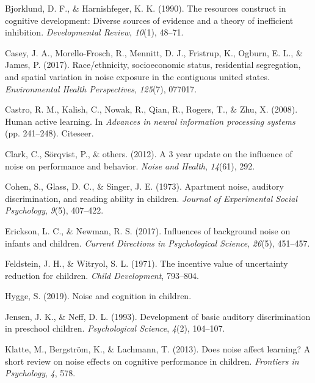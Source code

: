 \documentclass[10pt, letterpaper]{article}
\newenvironment{CSLReferences}%
  {}%
  {\par}
\begin{document}
\hypertarget{refs}{}
\begin{CSLReferences}{1}{0}
\leavevmode\hypertarget{ref-bjorklund1990}{}%
Bjorklund, D. F., \& Harnishfeger, K. K. (1990). The resources construct
in cognitive development: Diverse sources of evidence and a theory of
inefficient inhibition. \emph{Developmental Review}, \emph{10}(1),
48--71.

\leavevmode\hypertarget{ref-casey2017}{}%
Casey, J. A., Morello-Frosch, R., Mennitt, D. J., Fristrup, K., Ogburn,
E. L., \& James, P. (2017). Race/ethnicity, socioeconomic status,
residential segregation, and spatial variation in noise exposure in the
contiguous united states. \emph{Environmental Health Perspectives},
\emph{125}(7), 077017.

\leavevmode\hypertarget{ref-castro2008}{}%
Castro, R. M., Kalish, C., Nowak, R., Qian, R., Rogers, T., \& Zhu, X.
(2008). Human active learning. In \emph{Advances in neural information
processing systems} (pp. 241--248). Citeseer.

\leavevmode\hypertarget{ref-clark20123}{}%
Clark, C., Sörqvist, P., \& others. (2012). A 3 year update on the
influence of noise on performance and behavior. \emph{Noise and Health},
\emph{14}(61), 292.

\leavevmode\hypertarget{ref-cohen1973}{}%
Cohen, S., Glass, D. C., \& Singer, J. E. (1973). Apartment noise,
auditory discrimination, and reading ability in children. \emph{Journal
of Experimental Social Psychology}, \emph{9}(5), 407--422.

\leavevmode\hypertarget{ref-erickson2017}{}%
Erickson, L. C., \& Newman, R. S. (2017). Influences of background noise
on infants and children. \emph{Current Directions in Psychological
Science}, \emph{26}(5), 451--457.

\leavevmode\hypertarget{ref-feldstein1971}{}%
Feldstein, J. H., \& Witryol, S. L. (1971). The incentive value of
uncertainty reduction for children. \emph{Child Development}, 793--804.

\leavevmode\hypertarget{ref-hygge2019}{}%
Hygge, S. (2019). Noise and cognition in children.

\leavevmode\hypertarget{ref-jensen1993}{}%
Jensen, J. K., \& Neff, D. L. (1993). Development of basic auditory
discrimination in preschool children. \emph{Psychological Science},
\emph{4}(2), 104--107.

\leavevmode\hypertarget{ref-klatte2013}{}%
Klatte, M., Bergström, K., \& Lachmann, T. (2013). Does noise affect
learning? A short review on noise effects on cognitive performance in
children. \emph{Frontiers in Psychology}, \emph{4}, 578.


\end{CSLReferences}
\end{document}
